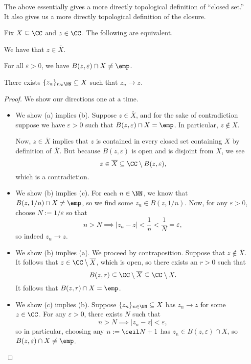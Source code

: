 The above essentially gives a more directly topological definition of ``closed set.'' It also gives us a more directly topological definition of the closure.
\begin{lemma}
	Fix $X\subseteq\CC$ and $z\in\CC$. The following are equivalent.
	\begin{listalph}
		\item We have that $z\in\overline X$.
		\item For all $\varepsilon>0$, we have $B(z,\varepsilon)\cap X\ne\emp$.
		\item There exists $\{z_n\}_{n\in\NN}\subseteq X$ such that $z_n\to z$.
	\end{listalph}
\end{lemma}
\begin{proof}
	We show our directions one at a time.
	\begin{itemize}
		\item We show (a) implies (b). Suppose $z\in\overline X$, and for the sake of contradiction suppose we have $\varepsilon>0$ such that $B(z,\varepsilon)\cap X=\emp$. In particular, $z\notin X$.

		Now, $z\in\overline X$ implies that $z$ is contained in every closed set containing $X$ by definition of $\overline X$. But because $B(z,\varepsilon)$ is open and is disjoint from $X$, we see
		\[z\in\overline X\subseteq\CC\setminus B(z,\varepsilon),\]
		which is a contradiction.
		\item We show (b) implies (c). For each $n\in\NN$, we know that $B(z,1/n)\cap X\ne\emp$, so we find some $z_n\in B(z,1/n)$. Now, for any $\varepsilon>0$, choose $N:=1/\varepsilon$ so that
		\[n>N\implies|z_n-z|<\frac1n<\frac1N=\varepsilon,\]
		so indeed $z_n\to z$.

		\item We show (b) implies (a). We proceed by contraposition. Suppose that $z\notin\overline X$. It follows that $z\in\CC\setminus\overline X$, which is open, so there exists an $r>0$ such that
		\[B(z,r)\subseteq\CC\setminus\overline X\subseteq\CC\setminus X.\]
		It follows that $B(z,r)\cap X=\emp$.

		\item We show (c) implies (b). Suppose $\{z_n\}_{n\in\NN}\subseteq X$ has $z_n\to z$ for some $z\in\CC$. For any $\varepsilon>0$, there exists $N$ such that
		\[n>N\implies|z_n-z|<\varepsilon,\]
		so in particular, choosing any $n:=\ceil N+1$ has $z_n\in B(z,\varepsilon)\cap X$, so $B(z,\varepsilon)\cap X\ne\emp$.
		\qedhere
	\end{itemize}
\end{proof}
